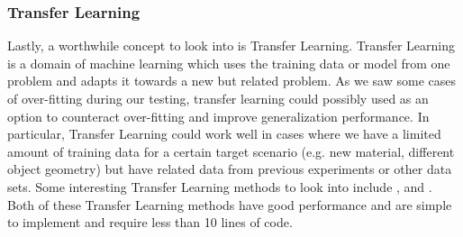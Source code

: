 \subsubsection{Transfer Learning}
Lastly, a worthwhile concept to look into is Transfer Learning. Transfer Learning is a domain of machine learning which uses the training data or model from one problem and adapts it towards a new but related problem. As we saw some cases of over-fitting during our testing, transfer learning could possibly used as an option to counteract over-fitting and improve generalization performance. In particular, Transfer Learning could work well in cases where we have a limited amount of training data for a certain target scenario (e.g. new material, different object geometry) but have related data from previous experiments or other data sets. Some interesting Transfer Learning methods to look into include \cite{daume07easyadapt}, and \cite{DBLP:journals/corr/SunFS15}. Both of these Transfer Learning methods have good performance and are simple to implement and require less than 10 lines of code. 
